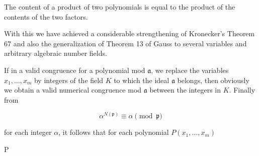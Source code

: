 The content of a product of two polynomials is equal to the product of the contents of the two factors.

With this we have achieved a considerable strengthening of Kronecker’s Theorem 67 and also the generalization of Theorem 13 of Gauss to several variables and arbitrary algebraic number fields.

If in a valid congruence for a polynomial mod $\mathfrak{a}$, we replace the variables $x_1, \ldots, x_m$ by integers of the field $K$ to which the ideal $\mathfrak{a}$ belongs, then obviously we obtain a valid numerical congruence mod $\mathfrak{a}$ between the integers in $K$. Finally from

$$\alpha^{N(\mathfrak{p})} \equiv \alpha \pmod{\mathfrak{p}}$$

for each integer $\alpha$, it follows that for each polynomial $P(x_1, \ldots, x_m)$

$$P
